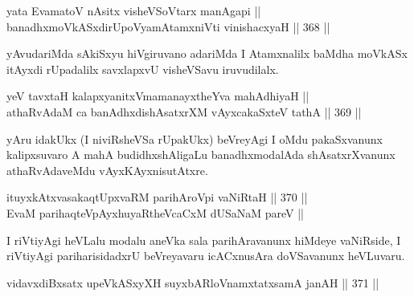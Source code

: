 
\begin{shl}
yata EvamatoV nAsitx visheVSoV\s tarx manAgapi || \\
banadhxmoVkASxdirUpoV\s yamAtamxniVti vinishacxyaH ||  368 ||  
\end{shl}

\begin{artha}
yAvudariMda sAkiSxyu hiVgiruvano adariMda I Atamxnalilx baMdha moVkASx
itAyxdi rUpadalilx savxlapxvU visheVSavu iruvudilalx.
\end{artha}


\begin{shl}
\footnotemark[1]yeV tavxtaH kalapxyanitxVmamanayxtheYva mahAdhiyaH || \\
athaRvAdaM ca banAdhxdishAsatxrXM vAyxcakaSxteV tathA ||  369 ||  
\end{shl}

\begin{artha}
yAru idakUkx (I niviRsheVSa rUpakUkx) beVreyAgi I oMdu
pakaSxvanunx kalipxsuvaro A mahA budidhxshAligaLu banadhxmodalAda
shAsatxrXvanunx athaRvAdaveMdu vAyxKAyxnisutAtxre.
\end{artha}

\begin{shl}
ituyxkAtxvasakaqtUpxvaRM parihAroV\s pi vaNiRtaH ||  370 ||  \\
EvaM parihaqteV\s pAyxhuyaRtheVcaCxM dUSaNaM pareV ||
\end{shl}

\begin{artha}
I riVtiyAgi heVLalu modalu aneVka sala parihAravanunx hiMdeye
vaNiRside, I riVtiyAgi pariharisidadxrU beVreyavaru icACxnusAra
doVSavanunx heVLuvaru.
\end{artha}

\begin{shl}
vidavxdiBxsatx upeVkASxyXH suyxbARloVnamxtatxsamA janAH ||  371 ||  
\end{shl}

